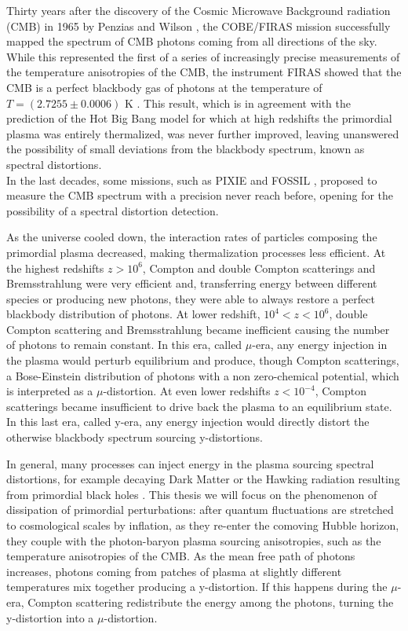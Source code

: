 Thirty years after the discovery of the Cosmic Microwave Background radiation (CMB) in 1965 by Penzias and Wilson \cite{1965ApJ...142..419P}, the COBE/FIRAS mission \cite{COBE1996} successfully mapped the spectrum of CMB photons coming from all directions of the sky. While this represented the first of a series of increasingly precise measurements of the temperature anisotropies of the CMB, the instrument FIRAS showed that the CMB is a perfect blackbody gas of photons at the temperature of $T=(2.7255\pm0.0006)$ K \cite{COBE1996}. This result, which is in agreement with the prediction of the Hot Big Bang model for which at high redshifts the primordial plasma was entirely thermalized, was never further improved, leaving unanswered the possibility of small deviations from the blackbody spectrum, known as spectral distortions.\\ In the last decades, some missions, such as PIXIE \cite{pixie} and FOSSIL \cite{IAS_Fossil}, proposed to measure the CMB spectrum with a precision never reach before, opening for the possibility of a spectral distortion detection.

As the universe cooled down, the interaction rates of particles composing the primordial plasma decreased, making thermalization processes less efficient. At the highest redshifts $z>10^{6}$, Compton and double Compton scatterings and Bremsstrahlung were very efficient and, transferring energy between different species or producing new photons, they were able to always restore a perfect blackbody distribution of photons. At lower redshift, $10^{4}<z<10^{6}$, double Compton scattering and Bremsstrahlung became inefficient causing the number of photons to remain constant. In this era, called $\mu$-era, any energy injection in the plasma would perturb equilibrium and produce, though Compton scatterings, a Bose-Einstein distribution of photons with a non zero-chemical potential, which is interpreted as a $\mu$-distortion. At even lower redshifts $z<10^{-4}$, Compton scatterings became insufficient to drive back the plasma to an equilibrium state. In this last era, called y-era, any energy injection would directly distort the otherwise blackbody spectrum sourcing y-distortions.

In general, many processes can inject energy in the plasma sourcing spectral distortions, for example decaying Dark Matter or the Hawking radiation resulting from primordial black holes \cite{Lucca_2020}. This thesis we will focus on the phenomenon of dissipation of primordial perturbations: after quantum fluctuations are stretched to cosmological scales by inflation, as they re-enter the comoving Hubble horizon, they couple with the photon-baryon plasma sourcing anisotropies, such as the temperature anisotropies of the CMB. As the mean free path of photons increases, photons coming from patches of plasma at slightly different temperatures mix together producing a y-distortion. If this happens during the $\mu$-era, Compton scattering redistribute the energy among the photons, turning the y-distortion into a $\mu$-distortion.\\


